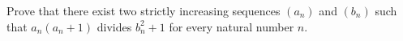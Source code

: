 Prove that there exist two strictly increasing sequences $(a_n)$ and $(b_n)$ such that $a_n(a_n + 1)$ divides $b_n^2 + 1$ for every natural number $n$.
